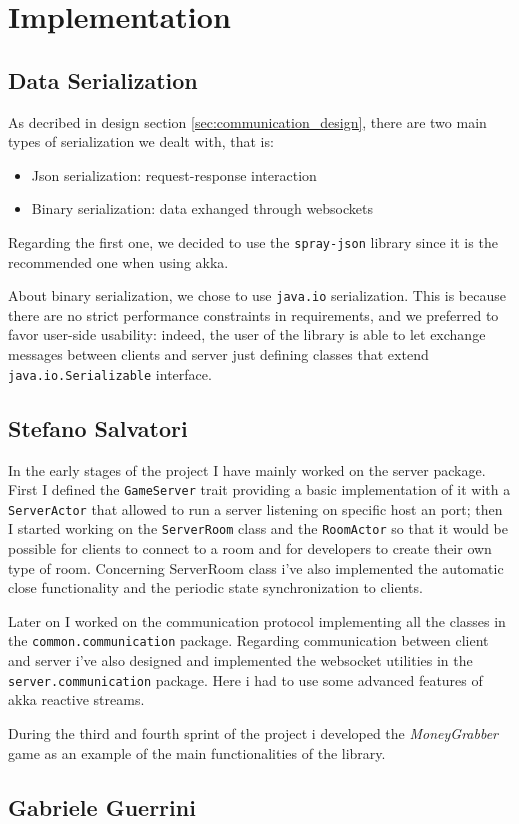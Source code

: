 \chapter{Implementation}
\section{Data Serialization}
As decribed in design section \ref{sec:communication_design}, there are two main types of serialization we dealt with, that is:
\begin{itemize}
	\item Json serialization: request-response interaction
	\item Binary serialization: data exhanged through websockets
\end{itemize}

Regarding the first one, we decided to use the \texttt{spray-json} library since it is the recommended one when using akka.

About binary serialization, we chose to use \texttt{java.io} serialization. This is because there are no strict performance constraints in requirements, and we preferred to favor user-side usability: indeed, the user of the library is able to let exchange messages between clients and server just defining classes that extend \texttt{java.io.Serializable} interface.



\section{Stefano Salvatori}
In the early stages of the project I have mainly worked on the server package. First I defined the \texttt{GameServer} trait providing a basic implementation of it with a \texttt{ServerActor} that allowed to run a server listening on specific host an port; then I started working on the \texttt{ServerRoom} class and the \texttt{RoomActor} so that it would be possible for clients to connect to a room and for developers to create their own type of room. Concerning ServerRoom class i've also implemented the automatic close functionality and the periodic state synchronization to clients.

Later on I worked on the communication protocol implementing all the classes in the \texttt{common.communication} package. Regarding communication between client and server i've also designed and implemented the websocket utilities in the \texttt{server.communication} package. Here i had to use some advanced features of akka reactive streams. 

During the third and fourth sprint of the project i developed the \textit{MoneyGrabber} game as an example of the main functionalities of the library. 

\section{Gabriele Guerrini}













